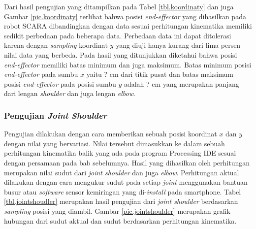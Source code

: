 Dari hasil pengujian yang ditampilkan pada Tabel \ref{tbl.koordinaty} dan juga Gambar \ref{pic.koordinaty} terlihat bahwa posisi \textit{end-effector} yang dihasilkan pada robot SCARA dibandingkan dengan data sesuai perhitungan kinematika memiliki sedikit perbedaan pada beberapa data. Perbedaan data ini dapat ditolerasi karena dengan \textit{sampling} koordinat $y$ yang diuji hanya kurang dari lima persen nilai data yang berbeda. Pada hasil yang ditunjukkan diketahui bahwa posisi \textit{end-effector} memiliki batas minimum dan juga maksimum. Batas minimum posisi \textit{end-effector} pada sumbu $x$ yaitu ? cm dari titik pusat dan batas maksimum posisi \textit{end-effector} pada posisi sumbu $y$ adalah ? cm yang merupakan panjang dari lengan \textit{shoulder} dan juga lengan \textit{elbow}. 

\subsubsection{Pengujian \textit{Joint Shoulder}}
Pengujian dilakukan dengan cara memberikan sebuah posisi koordinat $x$ dan $y$ dengan nilai yang bervariasi. Nilai tersebut dimasukkan ke dalam sebuah perhitungan kinematika balik yang ada pada program Processing IDE sesuai dengan persamaan pada bab sebelumnya. Hasil yang dihasilkan oleh perhitungan merupakan nilai sudut dari \textit{joint shoulder} dan juga \textit{elbow}. Perhitungan aktual dilakukan dengan cara mengukur sudut pada setiap \textit{joint} menggunakan bantuan busur atau \textit{software} sensor kemiringan yang di-\textit{install} pada smartphone. Tabel \ref{tbl.jointshoudler} merupakan hasil pengujian dari \textit{joint shoulder} berdasarkan \textit{sampling} posisi yang diambil. Gambar \ref{pic.jointshoulder} merupakan grafik hubungan dari sudut aktual dan sudut berdasarkan perhitungan kinematika. 

